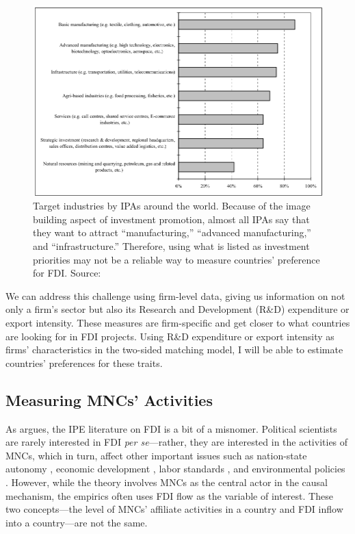 \begin{figure}[tbp] \centering
\includegraphics[width=\textwidth,keepaspectratio]{../figure/IPA_target_industries}
  \caption[Target industries by IPA around the world.]{Target industries by IPAs
    around the world. Because of the image building aspect of investment
    promotion, almost all IPAs say that they want to attract ``manufacturing,'' ``advanced
    manufacturing,'' and ``infrastructure.'' Therefore, using what is listed as investment priorities
    may not be a reliable way to measure countries' preference for FDI. Source: \citet{UNCTAD2001}}
  \label{fig:IPA_target_industries}
\end{figure}

We can address this challenge using firm-level data, giving us information on
not only a firm's sector but also its Research and Development (R\&D)
expenditure or export intensity. These measures are firm-specific and get closer
to what countries are looking for in FDI projects. Using R\&D expenditure or
export intensity as firms' characteristics in the two-sided matching model, I
will be able to estimate countries' preferences for these traits.

\subsection{Measuring MNCs' Activities}

As \citet{Kerner2014} argues, the IPE literature on FDI is a bit
of a misnomer. Political scientists are rarely interested in FDI \textit{per
se}---rather, they are interested in the activities of MNCs, which in turn,
affect other important issues such as nation-state autonomy \citep{Mosley2005},
economic development \citep{Moran1998}, labor standards \citep{Mosley2007}, and
environmental policies \citep{Prakash2007}. However, while the theory involves
MNCs as the central actor in the causal mechanism, the empirics often uses FDI
flow as the variable of interest. These two concepts---the level of
MNCs' affiliate activities in a country and FDI inflow into a country---are not
the same.

